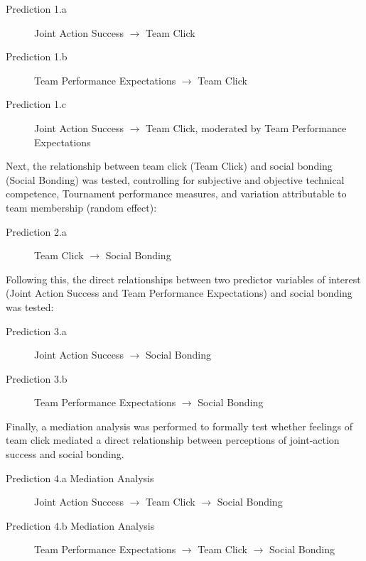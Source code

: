 \begin{description}
  \item [Prediction 1.a] Joint Action Success  $\rightarrow$ Team Click
  \item [Prediction 1.b] Team Performance Expectations $\rightarrow$ Team Click
  \item [Prediction 1.c] Joint Action Success $\rightarrow$ Team Click, moderated by Team Performance Expectations
\end{description}

Next, the relationship between team click (Team Click) and social bonding (Social Bonding) was tested, controlling for subjective and objective technical competence, Tournament performance measures, and variation attributable to team membership (random effect):

\begin{description}
  \item [Prediction 2.a] Team Click $\rightarrow$ Social Bonding
\end{description}

Following this, the direct relationships between two predictor variables of interest (Joint Action Success and Team Performance Expectations) and social bonding was tested:

\begin{description}
  \item [Prediction 3.a] Joint Action Success $\rightarrow$ Social Bonding
  \item [Prediction 3.b] Team Performance Expectations $\rightarrow$ Social Bonding
\end{description}

Finally, a mediation analysis was performed to formally test whether feelings of team click mediated a direct relationship between perceptions of joint-action success and social bonding.

\begin{description}
\item[Prediction 4.a Mediation Analysis] Joint Action Success $\rightarrow$ Team Click $\rightarrow$ Social Bonding
\item[Prediction 4.b Mediation Analysis] Team Performance Expectations $\rightarrow$ Team Click $\rightarrow$ Social Bonding
\end{description}











